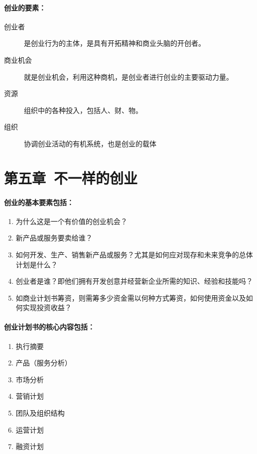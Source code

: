 \documentclass[UTF8]{ctexart}
\begin{document}
\paragraph{创业的要素：}
\begin{description}
\item[创业者]是创业行为的主体，是具有开拓精神和商业头脑的开创者。
\item[商业机会]就是创业机会，利用这种商机，是创业者进行创业的主要驱动力量。
\item[资源]组织中的各种投入，包括人、财、物。
\item[组织]协调创业活动的有机系统，也是创业的载体
\end{description}

\section{第五章\ 不一样的创业}
\paragraph{创业的基本要素包括：}
\begin{enumerate}[1)]
\item 为什么这是一个有价值的创业机会？
\item 新产品或服务要卖给谁？
\item 如何开发、生产、销售新产品或服务？尤其是如何应对现存和未来竞争的总体计划是什么？
\item 创业者是谁？即他们拥有开发创意并经营新企业所需的知识、经验和技能吗？
\item 如商业计划书筹资，则需筹多少资金需以何种方式筹资，如何使用资金以及如何实现投资收益？
\end{enumerate}
\paragraph{创业计划书的核心内容包括：}
\begin{enumerate}[1)]
    \item 执行摘要
    \item 产品（服务分析）
    \item 市场分析
    \item 营销计划
    \item 团队及组织结构
    \item 运营计划
    \item 融资计划
\end{enumerate}
\end{document}
